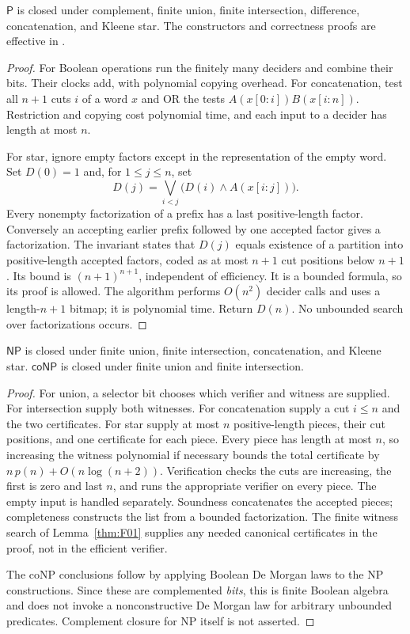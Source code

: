 \begin{theorem}\label{thm:C02}
$\mathsf P$ is closed under complement, finite union, finite intersection, difference, concatenation, and Kleene star. The constructors and correctness proofs are effective in \ipra.
\end{theorem}
\begin{proof}
For Boolean operations run the finitely many deciders and combine their bits. Their clocks add, with polynomial copying overhead. For concatenation, test all $n+1$ cuts $i$ of a word $x$ and OR the tests $A(x[0:i])B(x[i:n])$. Restriction and copying cost polynomial time, and each input to a decider has length at most $n$.

For star, ignore empty factors except in the representation of the empty word. Set $D(0)=1$ and, for $1\le j\le n$, set
\[
 D(j)=\bigvee_{i<j}\bigl(D(i)\land A(x[i:j])\bigr).
\]
Every nonempty factorization of a prefix has a last positive-length factor. Conversely an accepting earlier prefix followed by one accepted factor gives a factorization. The invariant states that $D(j)$ equals existence of a partition into positive-length accepted factors, coded as at most $n+1$ cut positions below $n+1$. Its bound is $(n+1)^{n+1}$, independent of efficiency. It is a bounded formula, so its proof is allowed. The algorithm performs $O(n^2)$ decider calls and uses a length-$n+1$ bitmap; it is polynomial time. Return $D(n)$. No unbounded search over factorizations occurs.
\end{proof}

\begin{theorem}\label{thm:C03}
$\mathsf{NP}$ is closed under finite union, finite intersection, concatenation, and Kleene star. $\mathsf{coNP}$ is closed under finite union and finite intersection.
\end{theorem}
\begin{proof}
For union, a selector bit chooses which verifier and witness are supplied. For intersection supply both witnesses. For concatenation supply a cut $i\le n$ and the two certificates. For star supply at most $n$ positive-length pieces, their cut positions, and one certificate for each piece. Every piece has length at most $n$, so increasing the witness polynomial if necessary bounds the total certificate by $n\,p(n)+O(n\log(n+2))$. Verification checks the cuts are increasing, the first is zero and last $n$, and runs the appropriate verifier on every piece. The empty input is handled separately. Soundness concatenates the accepted pieces; completeness constructs the list from a bounded factorization. The finite witness search of Lemma~\ref{thm:F01} supplies any needed canonical certificates in the proof, not in the efficient verifier.

The coNP conclusions follow by applying Boolean De Morgan laws to the NP constructions. Since these are complemented \emph{bits}, this is finite Boolean algebra and does not invoke a nonconstructive De Morgan law for arbitrary unbounded predicates. Complement closure for NP itself is not asserted.
\end{proof}

